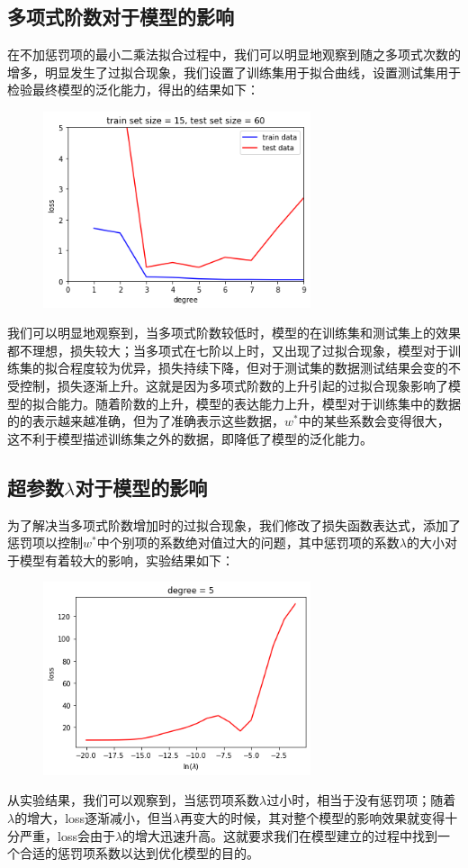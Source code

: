 \documentclass[12pt]{article}
\begin{document}
\subsection{多项式阶数对于模型的影响}
在不加惩罚项的最小二乘法拟合过程中，我们可以明显地观察到随之多项式次数的增多，明显发生了过拟合现象，我们设置了训练集用于拟合曲线，设置测试集用于检验最终模型的泛化能力，得出的结果如下：
\begin{figure}[H]
    \centering
    \includegraphics[width=0.7\textwidth]{s1.png}
\end{figure}
我们可以明显地观察到，当多项式阶数较低时，模型的在训练集和测试集上的效果都不理想，损失较大；当多项式在七阶以上时，又出现了过拟合现象，模型对于训练集的拟合程度较为优异，损失持续下降，但对于测试集的数据测试结果会变的不受控制，损失逐渐上升。这就是因为多项式阶数的上升引起的过拟合现象影响了模型的拟合能力。随着阶数的上升，模型的表达能力上升，模型对于训练集中的数据的的表示越来越准确，但为了准确表示这些数据，$w^*$中的某些系数会变得很大，这不利于模型描述训练集之外的数据，即降低了模型的泛化能力。\par
\subsection{超参数$\lambda$对于模型的影响}
为了解决当多项式阶数增加时的过拟合现象，我们修改了损失函数表达式，添加了惩罚项以控制$w^*$中个别项的系数绝对值过大的问题，其中惩罚项的系数$\lambda$的大小对于模型有着较大的影响，实验结果如下：
\begin{figure}[H]
    \centering
    \includegraphics[width=0.7\textwidth]{s2.png}
\end{figure}
从实验结果，我们可以观察到，当惩罚项系数$\lambda$过小时，相当于没有惩罚项；随着$\lambda$的增大，loss逐渐减小，但当$\lambda$再变大的时候，其对整个模型的影响效果就变得十分严重，loss会由于$\lambda$的增大迅速升高。这就要求我们在模型建立的过程中找到一个合适的惩罚项系数以达到优化模型的目的。
\end{document}
